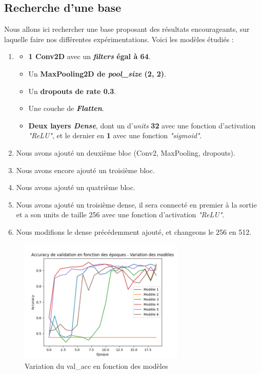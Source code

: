 \documentclass{rapport}
\begin{document}
        \subsection{Recherche d'une base}
        Nous allons ici rechercher une base proposant des résultats encourageants, sur laquelle faire nos différentes expérimentations. Voici les modèles étudiés :
        \begin{enumerate}
            \item \begin{itemize}
                \item \textbf{1 Conv2D} avec un \textbf{\textit{filters} égal à 64}.
                \item Un \textbf{MaxPooling2D de \textit{pool\_size} (2, 2)}.
                \item Un \textbf{dropouts de rate 0.3}.
                \item Une couche de \textit{\textbf{Flatten}}.
                \item \textbf{Deux layers \textit{Dense}}, dont un d'\textit{units} \textbf{32} avec une fonction d'activation \textit{"ReLU"}, et le dernier en \textbf{1} avec une fonction \textit{"sigmoid"}.
            \end{itemize}
            
            \item Nous avons ajouté un deuxième bloc (Conv2, MaxPooling, dropouts).
            
            \item Nous avons encore ajouté un troisième bloc.
            
            \item Nous avons ajouté un quatrième bloc.
            
            \item Nous avons ajouté un troisième dense, il sera connecté en premier à la sortie et a son units de taille 256 avec une fonction d'activation \textit{"ReLU"}.
            
            \item Nous modifions le dense précédemment ajouté, et changeons le 256 en 512.
        \end{enumerate}
        
        \begin{figure}[H]
            \centering
            \includegraphics[width=0.7\textwidth]{rapport/plots/model_acc.png}
            \caption{Variation du val\_acc en fonction des modèles}
            \label{fig:mesh1_model}
        \end{figure}
\end{document}
